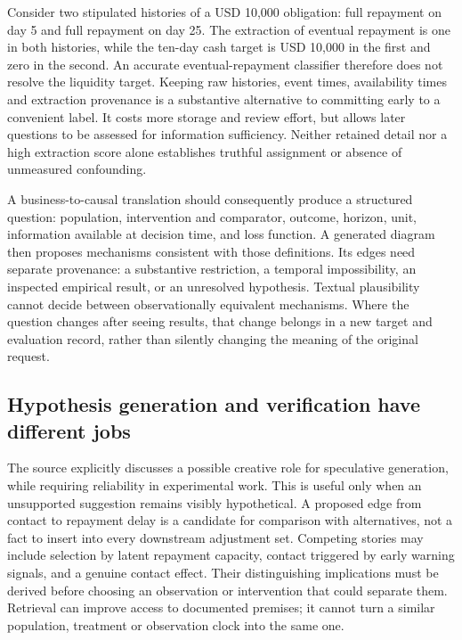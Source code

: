 Consider two stipulated histories of a USD 10,000 obligation: full repayment on
day 5 and full repayment on day 25. The extraction of eventual repayment is one
in both histories, while the ten-day cash target is USD 10,000 in the first and
zero in the second. An accurate eventual-repayment classifier therefore does not
resolve the liquidity target. Keeping raw histories, event times, availability
times and extraction provenance is a substantive alternative to committing early
to a convenient label. It costs more storage and review effort, but allows later
questions to be assessed for information sufficiency. Neither retained detail nor
a high extraction score alone establishes truthful assignment or absence of
unmeasured confounding.\citep{exec24_scimethod_reference}

A business-to-causal translation should consequently produce a structured question:
population, intervention and comparator, outcome, horizon, unit, information available
at decision time, and loss function. A generated diagram then proposes mechanisms
consistent with those definitions. Its edges need separate provenance: a substantive
restriction, a temporal impossibility, an inspected empirical result, or an
unresolved hypothesis. Textual plausibility cannot decide between observationally
equivalent mechanisms. Where the question changes after seeing results, that change
belongs in a new target and evaluation record, rather than silently changing the
meaning of the original request.

\subsection{Hypothesis generation and verification have different jobs}

The source explicitly discusses a possible creative role for speculative generation,
while requiring reliability in experimental work. This is useful only when an
unsupported suggestion remains visibly hypothetical. A proposed edge from contact
to repayment delay is a candidate for comparison with alternatives,
not a fact to insert into every downstream adjustment set. Competing stories may
include selection by latent repayment capacity, contact triggered by early warning
signals, and a genuine contact effect. Their distinguishing implications must be
derived before choosing an observation or intervention that could separate them.
Retrieval can improve access to documented premises; it cannot turn a similar
population, treatment or observation clock into the same one.

